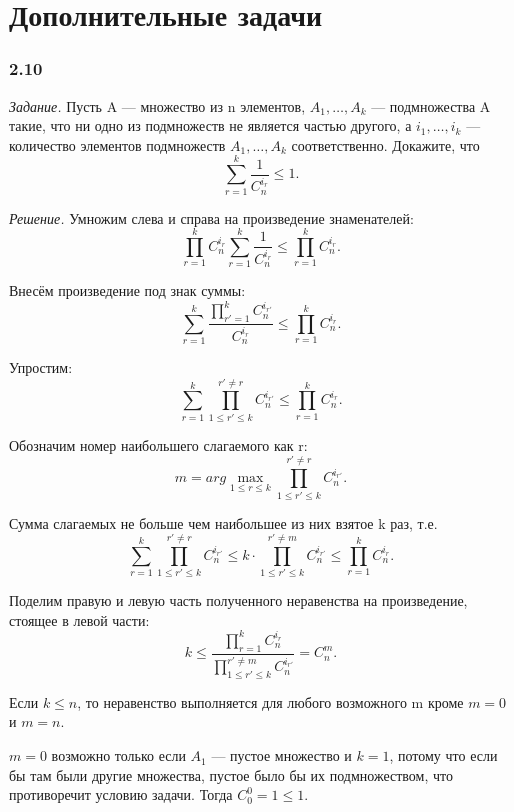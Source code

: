 \documentclass{book}
\begin{document}
\section*{Дополнительные задачи}

\subsubsection*{2.10}

\textit{Задание.} Пусть A --- множество из n элементов,
$ A_1,  \dotsc , A_k $ --- подмножества A такие, что ни одно из подмножеств не является частью другого,
а $ i_1,  \dotsc , i_k $ --- количество элементов подмножеств $ A_1,  \dotsc , A_k $ соответственно.
Докажите, что
$$ \sum \limits_{ r = 1 }^k \frac{ 1 }{ C_n^{ i_r } } \leq 1.$$

\textit{Решение.} Умножим слева и справа на произведение знаменателей:
$$ \prod \limits_{r=1}^k C_n^{i_r} \sum \limits_{r=1}^k \frac{1}{C_n^{i_r}} \leq
\prod \limits_{r=1}^k C_n^{i_r}. $$

Внесём произведение под знак суммы:
$$ \sum \limits_{r=1}^k \frac{ \prod \limits_{r'=1}^k C_n^{i_{r'}}}{C_n^{i_r}} \leq
\prod \limits_{r=1}^k C_n^{i_r}. $$

Упростим:
$$ \sum \limits_{r=1}^k \prod \limits_{1 \leq r' \leq k}^{r' \neq r} C_n^{i_{r'}} \leq
\prod \limits_{r=1}^k C_n^{i_r}. $$

Обозначим номер наибольшего слагаемого как r:
$$ m = arg \max \limits_{1 \leq r \leq k} \prod \limits_{1 \leq r' \leq k}^{r' \neq r} C_n^{i_{r'}}. $$

Сумма слагаемых не больше чем наибольшее из них взятое k раз, т.е.
$$ \sum \limits_{r=1}^k \prod \limits_{1 \leq r' \leq k}^{r' \neq r} C_n^{i_{r'}} \leq
k \cdot \prod \limits_{1 \leq r' \leq k}^{r' \neq m} C_n^{i_{r'}} \leq
\prod \limits_{r=1}^k C_n^{i_r}. $$

Поделим правую и левую часть полученного неравенства на произведение, стоящее в левой части:
$$ k \leq
\frac{ \prod \limits_{r=1}^k C_n^{i_r}}{ \prod \limits_{1 \leq r' \leq k}^{r' \neq m} C_n^{i_{r'}}} =
C_n^m. $$

Если $ k \leq n $, то неравенство выполняется для любого возможного m кроме $ m = 0 $ и $ m = n $.

$ m = 0 $ возможно только если $A_1$ --- пустое множество и $k = 1$,
потому что если бы там были другие множества, пустое было бы их подмножеством, что противоречит условию задачи.
Тогда $ C_0^0 = 1 \leq 1$.
\end{document}

